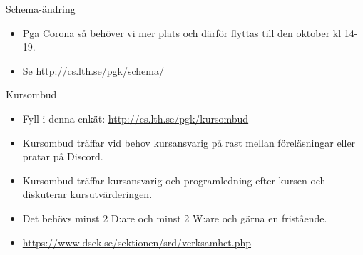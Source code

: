 
\ifkompendium\else
\begin{SlideExtra}{Schema-ändring}
  \begin{itemize}
    \item Pga Corona så behöver vi mer plats och därför flyttas  till den  oktober kl 14-19.
    \item Se \url{http://cs.lth.se/pgk/schema/}
  \end{itemize}
  \end{SlideExtra}
  
\begin{SlideExtra}{Kursombud}
\begin{itemize}
\item Fyll i denna enkät: \url{http://cs.lth.se/pgk/kursombud}
\item Kursombud träffar vid behov kursansvarig på rast mellan föreläsningar eller pratar på Discord.
\item Kursombud träffar kursansvarig och programledning efter kursen och diskuterar kursutvärderingen.
\item Det behövs minst 2 D:are och minst 2 W:are och gärna en fristående.
\item {\SlideFontSmall\url{https://www.dsek.se/sektionen/srd/verksamhet.php}}
\end{itemize}
\end{SlideExtra}
\fi
